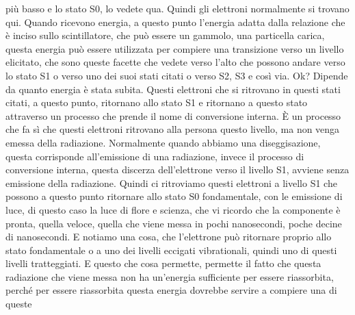 più basso e lo stato S0, lo vedete qua. Quindi gli elettroni normalmente si trovano qui. Quando ricevono energia, a questo punto l'energia adatta dalla relazione che è inciso sullo scintillatore, che può essere un gammolo, una particella carica, questa energia può essere utilizzata per compiere una transizione verso un livello elicitato, che sono queste facette che vedete verso l'alto che possono andare verso lo stato S1 o verso uno dei suoi stati citati o verso S2, S3 e così via. Ok? Dipende da quanto energia è stata subita. Questi elettroni che si ritrovano in questi stati citati, a questo punto, ritornano allo stato S1 e ritornano a questo stato attraverso un processo che prende il nome di conversione interna. È un processo che fa sì che questi elettroni ritrovano alla persona questo livello, ma non venga emessa della radiazione. Normalmente quando abbiamo una diseggisazione, questa corrisponde all'emissione di una radiazione, invece il processo di conversione interna, questa discerza dell'elettrone verso il livello S1, avviene senza emissione della radiazione. Quindi ci ritroviamo questi elettroni a livello S1 che possono a questo punto ritornare allo stato S0 fondamentale, con le emissione di luce, di questo caso la luce di flore e scienza, che vi ricordo che la componente è pronta, quella veloce, quella che viene messa in pochi nanosecondi, poche decine di nanosecondi. E notiamo una cosa, che l'elettrone può ritornare proprio allo stato fondamentale o a uno dei livelli eccigati vibrationali, quindi uno di questi livelli tratteggiati. E questo che cosa permette, permette il fatto che questa radiazione che viene messa non ha un'energia sufficiente per essere riassorbita, perché per essere riassorbita questa energia dovrebbe servire a compiere una di queste 

